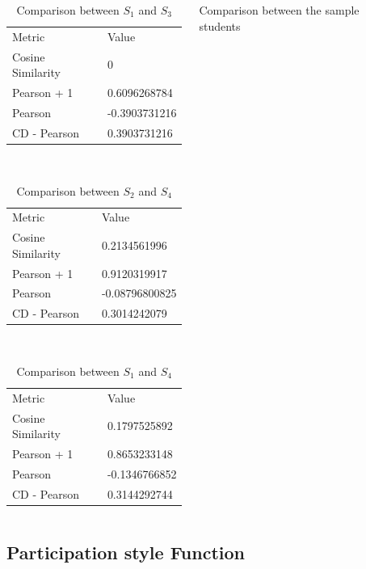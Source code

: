 \begin{columns}
\begin{column}{0.5\textwidth}
\begin{table}[]
\begin{tabular}{ll}
            Metric            & Value         \\
            Cosine Similarity & 0             \\
            Pearson + 1       & 0.6096268784  \\
            Pearson           & -0.3903731216 \\
            CD - Pearson      & 0.3903731216
            \end{tabular}
            \caption{Comparison between $S_1$ and $S_3$}
        \end{table}\\
        \begin{table}[]
            \begin{tabular}{ll}
            Metric            & Value         \\
            Cosine Similarity & 0.2134561996  \\
            Pearson + 1       & 0.9120319917  \\
            Pearson           & -0.08796800825 \\
            CD - Pearson      & 0.3014242079
            \end{tabular}
            \caption{Comparison between $S_2$ and $S_4$}
        \end{table}\\
        \begin{table}[]
            \begin{tabular}{ll}
            Metric            & Value         \\
            Cosine Similarity & 0.1797525892  \\
            Pearson + 1       & 0.8653233148  \\
            Pearson           & -0.1346766852 \\
            CD - Pearson      & 0.3144292744
            \end{tabular}
            \caption{Comparison between $S_1$ and $S_4$}
        \end{table}
    \end{column}
    \caption{Comparison between the sample students}
    \label{table:results_interests_comp}
\end{columns}

\subsection{Participation style Function}

